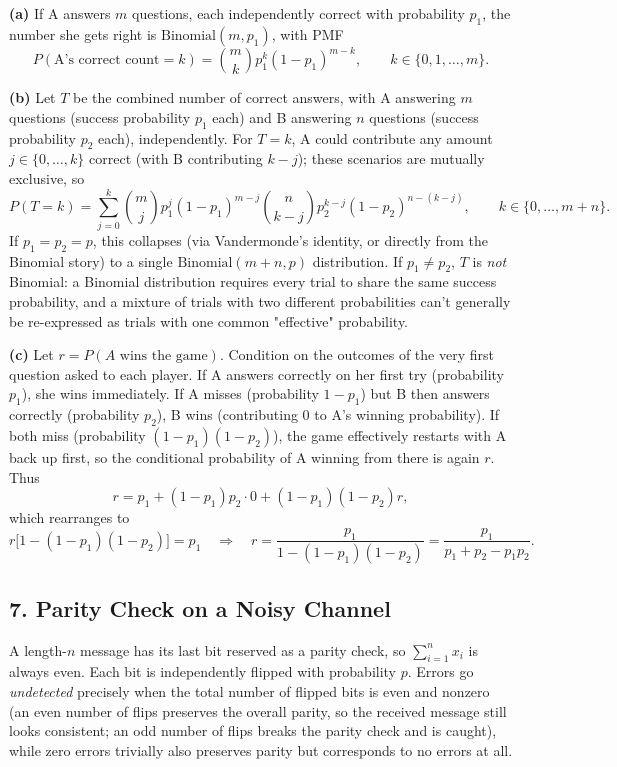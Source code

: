 \documentclass{article}
\begin{document}
\textbf{(a)} If A answers $m$ questions, each independently correct with probability $p_1$, the number she gets right is $\text{Binomial}(m,p_1)$, with PMF
$$
P(\text{A's correct count}=k) = \binom{m}{k}p_1^k(1-p_1)^{m-k}, \qquad k\in\{0,1,\dots,m\}.
$$

\medskip
\textbf{(b)} Let $T$ be the combined number of correct answers, with A answering $m$ questions (success probability $p_1$ each) and B answering $n$ questions (success probability $p_2$ each), independently. For $T=k$, A could contribute any amount $j\in\{0,\dots,k\}$ correct (with B contributing $k-j$); these scenarios are mutually exclusive, so
$$
P(T=k) = \sum_{j=0}^{k}\binom{m}{j}p_1^j(1-p_1)^{m-j}\binom{n}{k-j}p_2^{k-j}(1-p_2)^{n-(k-j)}, \qquad k\in\{0,\dots,m+n\}.
$$
If $p_1=p_2=p$, this collapses (via Vandermonde's identity, or directly from the Binomial story) to a single $\text{Binomial}(m+n,p)$ distribution. If $p_1\ne p_2$, $T$ is \emph{not} Binomial: a Binomial distribution requires every trial to share the same success probability, and a mixture of trials with two different probabilities can't generally be re-expressed as trials with one common "effective" probability.

\medskip
\textbf{(c)} Let $r=P(A\text{ wins the game})$. Condition on the outcomes of the very first question asked to each player. If A answers correctly on her first try (probability $p_1$), she wins immediately. If A misses (probability $1-p_1$) but B then answers correctly (probability $p_2$), B wins (contributing $0$ to A's winning probability). If both miss (probability $(1-p_1)(1-p_2)$), the game effectively restarts with A back up first, so the conditional probability of A winning from there is again $r$. Thus
$$
r = p_1 + (1-p_1)p_2\cdot 0 + (1-p_1)(1-p_2)r,
$$
which rearranges to
$$
r\big[1-(1-p_1)(1-p_2)\big] = p_1 \quad\Longrightarrow\quad r = \frac{p_1}{1-(1-p_1)(1-p_2)} = \frac{p_1}{p_1+p_2-p_1p_2}.
$$

\subsection*{7. Parity Check on a Noisy Channel}

A length-$n$ message has its last bit reserved as a parity check, so $\sum_{i=1}^n x_i$ is always even. Each bit is independently flipped with probability $p$. Errors go \emph{undetected} precisely when the total number of flipped bits is even and nonzero (an even number of flips preserves the overall parity, so the received message still looks consistent; an odd number of flips breaks the parity check and is caught), while zero errors trivially also preserves parity but corresponds to no errors at all.
\end{document}
